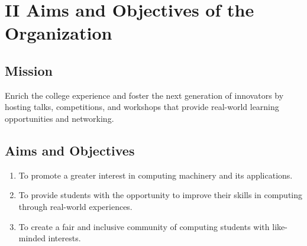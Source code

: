 \section{II \textendash{} Aims and Objectives of the Organization}
\subsection{Mission}
Enrich the college experience and foster the next generation of innovators by
hosting talks, competitions, and workshops that provide real-world learning
opportunities and networking.

\subsection{Aims and Objectives}
\begin{enumerate}
  \item To promote a greater interest in computing machinery and its
  applications.
  \item To provide students with the opportunity to improve their skills in
  computing through real-world experiences.
  \item To create a fair and inclusive community of computing students with
  like-minded interests.
\end{enumerate}
